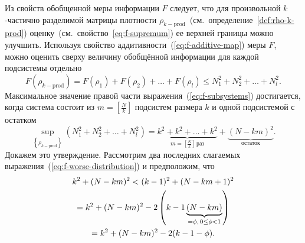 \begin{definition}\label{def:rho-k-prod}
  
\end{definition}
%
%
Из свойств обобщенной меры информации $F$ следует,
что для произвольной $k$-частично разделимой матрицы плотности $\rho_{k-\mathrm{prod}}$~(см.~определение~\ref{def:rho-k-prod})
оценку~(см.~свойство~\ref{eq:f-supremum}) ее верхней границы можно улучшить.
Используя свойство аддитивности~(\ref{eq:f-additive-map}) меры $F$,
можно оценить сверху величину обобщённой информации для каждой подсистемы отдельно
%
\begin{equation}\label{eq:f-subsystems}
  F(\rho_{k-\mathrm{prod}}) =
  F(\rho_1) + F(\rho_2) + \dots + F(\rho_l)
  \leq N^2_1 + N^2_2 + \dots + N^2_l.
\end{equation}
%
Максимальное значение правой части выражения~(\ref{eq:f-subsystems}) достигается,
когда система состоит из $m = \left[\frac N k \right]$ подсистем размера $k$
и одной подсистемой с остатком
%
\begin{equation}\label{eq:f-worse-distribution}
  \sup_{\left\{\rho_{k-\mathrm{prod}}\right\}}
    \left(N^2_1 + N^2_2 + \dots + N^2_l\right)
  = \underbrace{
    k^2 + k^2 + \dots + k^2
    }_{m = \left[\frac N k \right] \, \mbox{раз}}
    + \underbrace{(N-km)^2}_{\mbox{остаток}}.
\end{equation}
%
Докажем это утверждение.
Рассмотрим два последних слагаемых выражения~(\ref{eq:f-worse-distribution}) и предположим, что
%
\begin{multline}\label{eq:n-i-distribution-inequality}
  k^2 + (N-km)^2 < (k - 1)^2 + (N-km + 1)^2 \\
  = k^2 + (N-km)^2
    - 2\left( k - 1 \underbrace{(N-km)}_{ = \phi, \, 0 \leq \phi < 1} \right) \\
  = k^2 + (N-km)^2 - 2(k - 1 - \phi).
\end{multline}
